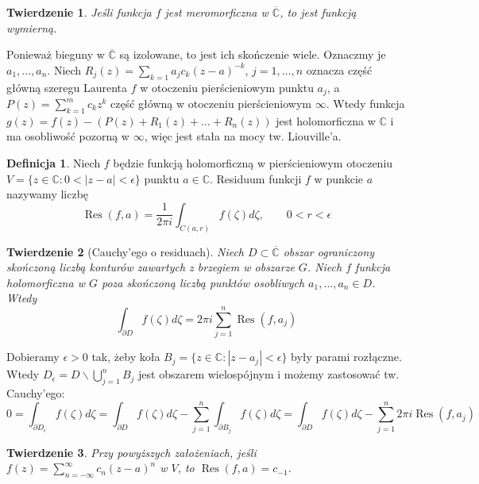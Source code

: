 \documentclass[11pt]{article}
\newcommand{\abs}[1]{\left|#1\right|} %
\newcommand{\extcomplex}{\overline{\mathbb{C}}} %
\newcommand{\res}{\mathop{\text{Res}}\limits} %
\theoremstyle{plain}
\newtheorem*{theorem}{Twierdzenie}
\theoremstyle{definition}
\newtheorem*{definition}{Definicja}
\theoremstyle{remark}
\let\oldendproof\endproof
\renewenvironment{proof}[1][\proofname]{
  \oldproof[\textsc{\small #1}]
}{\oldendproof}
\begin{document}
\begin{theorem}
  Jeśli funkcja $f$ jest meromorficzna w $ \extcomplex $, to jest funkcją wymierną.
\end{theorem}

\begin{proof}
  Ponieważ bieguny w $ \extcomplex $ są izolowane, to jest ich skończenie wiele.
  Oznaczmy je $ a_1, \dots, a_n $.
  Niech $ R_j(z) = \sum_{k=1}{a_j} c_{k} (z-a)^{-k} $, $ j = 1, \dots, n $ oznacza część główną szeregu Laurenta $ f $ w otoczeniu pierścieniowym punktu $ a_j $,
  a $ P(z) = \sum_{k=1}^{m} c_k z^k $ część główną w otoczeniu pierścieniowym $ \infty $.
  Wtedy funkcja $ g(z) = f(z) - (P(z) + R_1(z) + \dots + R_n(z)) $ jest holomorficzna w $ \mathbb{C} $ i ma osobliwość pozorną w $ \infty $,
  więc jest stała na mocy tw. Liouville'a.
\end{proof}

\begin{definition}
  Niech $ f $ będzie funkcją holomorficzną w pierścieniowym otoczeniu $ V = \{z \in \mathbb{C}\colon 0 < \abs{z-a} < \epsilon \} $ punktu $ a \in \mathbb{C} $.
  Residuum funkcji $ f $ w punkcie $ a $ nazywamy liczbę
  $$
    \res(f, a) = \frac{1}{2 \pi i} \int_{C(a, r)} f(\zeta) d\zeta,
    \qquad
    0 < r < \epsilon
  $$
\end{definition}

\begin{theorem}[Cauchy’ego o residuach]
  Niech $ D \subset \extcomplex $ obszar ograniczony skończoną liczbą konturów zawartych z brzegiem w obszarze $ G $.
  Niech $ f $ funkcja holomorficzna w $ G $ poza skończoną liczbą punktów osobliwych $ a_1, \dots, a_n \in D $.
  Wtedy
  $$
    \int_{\partial D} f(\zeta) d\zeta = 2 \pi i \sum_{j=1}^n \res(f, a_j)
  $$ 
\end{theorem}

\begin{proof}
  Dobieramy $ \epsilon > 0 $ tak, żeby koła $ B_j = \{ z \in \mathbb{C}: \abs{z - a_j} < \epsilon \} $ były parami rozłączne.
  Wtedy $ D_{\epsilon} = D\backslash\bigcup\limits_{j=1}^{n} B_j $ jest obszarem wielospójnym i możemy zastosować tw. Cauchy'ego:
  $$
    0
    = \int_{\partial D_{\epsilon}} f(\zeta) d\zeta
    = \int_{\partial D} f(\zeta) d\zeta - \sum_{j=1}^{n} \int_{\partial B_j} f(\zeta) d\zeta
    = \int_{\partial D} f(\zeta) d\zeta - \sum_{j=1}^{n} 2 \pi i \res(f, a_j)
  $$
\end{proof}

\begin{theorem}
  Przy powyższych założeniach, jeśli $ f(z) = \sum_{n=-\infty}^{\infty} c_n (z-a)^n $ w $ V $, to $ \res(f, a) = c_{-1} $.
\end{theorem}
\end{document}
